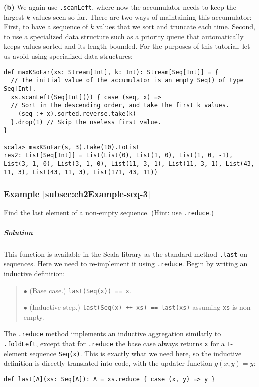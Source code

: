 \textbf{(b)} We again use \lstinline!.scanLeft!, where now the accumulator
needs to keep the largest $k$ values seen so far. There are two ways
of maintaining this accumulator: First, to have a sequence of $k$
values that we sort and truncate each time. Second, to use a specialized
data structure such as a priority queue that automatically keeps values
sorted and its length bounded. For the purposes of this tutorial,
let us avoid using specialized data structures:
\begin{lstlisting}
def maxKSoFar(xs: Stream[Int], k: Int): Stream[Seq[Int]] = {
  // The initial value of the accumulator is an empty Seq() of type Seq[Int].
  xs.scanLeft(Seq[Int]()) { case (seq, x) =>
  // Sort in the descending order, and take the first k values.
    (seq :+ x).sorted.reverse.take(k)
  }.drop(1) // Skip the useless first value.
}

scala> maxKSoFar(s, 3).take(10).toList
res2: List[Seq[Int]] = List(List(0), List(1, 0), List(1, 0, -1), List(3, 1, 0), List(3, 1, 0), List(11, 3, 1), List(11, 3, 1), List(43, 11, 3), List(43, 11, 3), List(171, 43, 11)) 
\end{lstlisting}


\subsubsection{Example \label{subsec:ch2Example-seq-3}\ref{subsec:ch2Example-seq-3}}

Find the last element of a non-empty sequence. (Hint: use \lstinline!.reduce!.)

\subparagraph{Solution}

This function is available in the Scala library as the standard method
\lstinline!.last! on sequences. Here we need to re-implement it using
\lstinline!.reduce!. Begin by writing an inductive definition:
\begin{quotation}
$\bullet$ (Base case.) \lstinline!last(Seq(x)) == x!.

$\bullet$ (Inductive step.) \lstinline!last(Seq(x) ++ xs) == last(xs)!
assuming \lstinline!xs! is non-empty.
\end{quotation}
The \lstinline!.reduce! method implements an inductive aggregation
similarly to \lstinline!.foldLeft!, except that for \lstinline!.reduce!
the base case  always returns \lstinline!x! for a $1$-element sequence
\lstinline!Seq(x)!. This is exactly what we need here, so the inductive
definition is directly translated into code, with the updater function
$g(x,y)=y$:
\begin{lstlisting}
def last[A](xs: Seq[A]): A = xs.reduce { case (x, y) => y }
\end{lstlisting}


